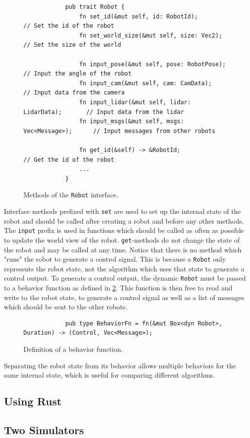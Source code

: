 \begin{figure}[H]
    \begin{center}
        \begin{verbatim}
            pub trait Robot {
                fn set_id(&mut self, id: RobotId);                 // Set the id of the robot
                fn set_world_size(&mut self, size: Vec2);          // Set the size of the world

                fn input_pose(&mut self, pose: RobotPose);         // Input the angle of the robot
                fn input_cam(&mut self, cam: CamData);             // Input data from the camera
                fn input_lidar(&mut self, lidar: LidarData);       // Input data from the lidar
                fn input_msgs(&mut self, msgs: Vec<Message>);      // Input messages from other robots

                fn get_id(&self) -> &RobotId;                      // Get the id of the robot
                ...
            }
        \end{verbatim}
    \end{center}
    \caption{Methods of the \texttt{Robot} interface.}\label{fig:robot-interface}
\end{figure}

Interface methods prefixed with \texttt{set} are used to set up the internal state of the robot and should be called after creating a robot and before any other methods. The \texttt{input} prefix is used in functions which should be called as often as possible to update the world view of the robot. \texttt{get}-methods do not change the state of the robot and may be called at any time. Notice that there is no method which "runs" the robot to generate a control signal. This is because a \texttt{Robot} only represents the robot state, not the algorithm which uses that state to generate a control output. To generate a control output, the dynamic \texttt{Robot} must be passed to a behavior function as defined in \cref{fig:behavior-fn}. This function is then free to read and write to the robot state, to generate a control signal as well as a list of messages which should be sent to the other robots.

\begin{figure}[H]
    \begin{center}
        \begin{verbatim}
            pub type BehaviorFn = fn(&mut Box<dyn Robot>, Duration) -> (Control, Vec<Message>);
        \end{verbatim}
    \end{center}
    \caption{Definition of a behavior function.}\label{fig:behavior-fn}
\end{figure}

Separating the robot state from its behavior allows multiple behaviors for the same internal state, which is useful for comparing different algorithms.

\subsection{Using Rust}

\subsection{Two Simulators}
